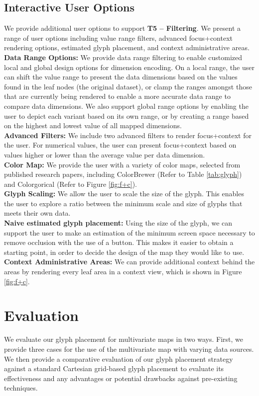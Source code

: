 \subsection{Interactive User Options}
We provide additional user options to support \textbf{T5 -- Filtering}. We present a range of user options including value range filters, advanced focus+context rendering options, estimated glyph placement, and context administrative areas.\\
\textbf{Data Range Options:} We provide data range filtering to enable customized local and global design options for dimension encoding. On a local range, the user can shift the value range to present the data dimensions based on the values found in the leaf nodes (the original dataset), or clamp the ranges amongst those that are currently being rendered to enable a more accurate data range to compare data dimensions. We also support global range options by enabling the user to depict each variant based on its own range, or by creating a range based on the highest and lowest value of all mapped dimensions.  \\
\textbf{Advanced Filters:} We include two advanced filters to render focus+context for the user. For numerical values, the user can present focus+context based on values higher or lower than the average value per data dimension.\\
\textbf{Color Map:} We provide the user with a variety of color maps, selected from published research papers, including ColorBrewer \cite{brewer2003transition} (Refer to Table \ref{tab:glyph}) and Colorgorical \cite{gramazio2017colorgorical} (Refer to Figure \ref{fig:f+c}).\\
\textbf{Glyph Scaling:} We allow the user to scale the size of the glyph. This enables the user to explore a ratio between the minimum scale and size of glyphs that meets their own data.\\
\textbf{Naive estimated glyph placement:} Using the size of the glyph, we can support the user to make an estimation of the minimum screen space necessary to remove occlusion with the use of a button. This makes it easier to obtain a starting point, in order to decide the design of the map they would like to use.\\
\textbf{Context Administrative Areas:} We can provide additional context behind the areas by rendering every leaf area in a context view, which is shown in Figure \ref{fig:f+c}.

\section{Evaluation} 
We evaluate our glyph placement for multivariate maps in two ways. First, we provide three cases for the use of the multivariate map with varying data sources. We then provide a comparative evaluation of our glyph placement strategy against a standard Cartesian grid-based glyph placement to evaluate its effectiveness and any advantages or potential drawbacks against pre-existing techniques.


